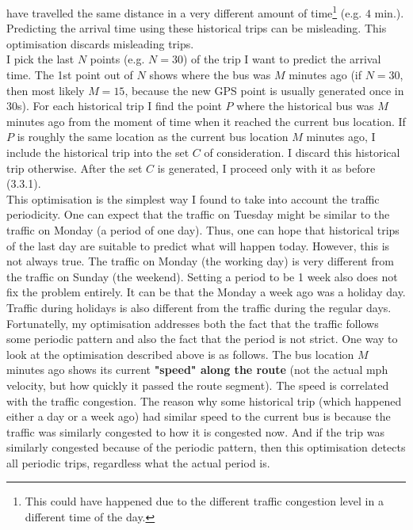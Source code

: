 \documentclass[12pt,a4paper,oneside,openright]{report}
\begin{document}
have travelled the same distance in a very different amount of 
time\footnote{This could have happened due to the different traffic congestion level
in a different time of the day.} (e.g. $4$ min.). Predicting the arrival time using
these historical trips can be misleading. This optimisation discards misleading
trips. \\

I pick the last $N$ points (e.g. $N = 30$) of the trip I want to predict the arrival
time. The 1st point out of $N$ shows where the bus was $M$ minutes ago (if $N=30$, then
most likely $M=15$, because the new GPS point is usually generated once in 30s).
For each historical trip I find the point $P$ where the historical bus was $M$ minutes
ago from the moment of time when it reached the current bus location. If $P$ is roughly
the same location as the current bus location $M$ minutes ago, I include the historical
trip into the set $C$ of consideration. I discard this historical trip otherwise.
After the set $C$ is generated, I proceed only with it as before (3.3.1). \\

This optimisation is the simplest way I found to take into account the traffic
periodicity. One can expect that the traffic on Tuesday might be similar to the
traffic on Monday (a period of one day). Thus, one can hope that historical trips
of the last day are suitable to predict what will happen today. However,
this is not always true. The traffic on Monday (the working day) is very different
from the traffic on Sunday (the weekend). Setting a period to be 1 week also does not
fix the problem entirely. It can be that the Monday a week ago was a holiday day.
Traffic during holidays is also different from the traffic during the regular days. \\

Fortunatelly, my optimisation addresses both the fact that the traffic follows some
periodic pattern and also the fact that the period is not strict. One way to look at
the optimisation described above is as follows. The bus location $M$ minutes ago shows
its current \textbf{"speed" along the route} (not the actual mph velocity, but how
quickly it passed the route segment). The speed is correlated with the traffic
congestion. The reason why some historical trip (which happened either a day or a week
ago) had similar speed to the current bus is because the traffic was similarly
congested to how it is congested now. And if the trip was similarly congested because
of the periodic pattern, then this optimisation detects all periodic trips, regardless
what the actual period is. \\
\end{document}
